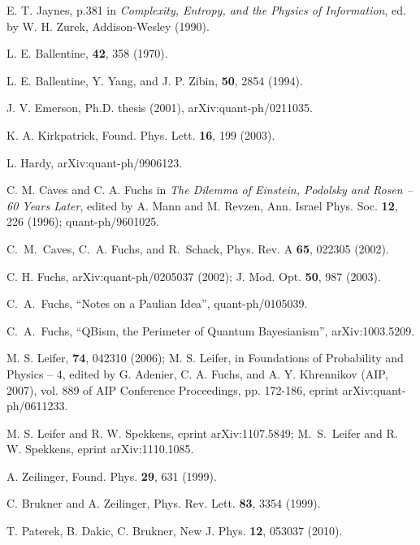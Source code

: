 \documentclass[pra,superscriptaddress,nofootinbib,12pt]{revtex4-2}
\begin{document}
\begin{thebibliography}{9}
 E. T. Jaynes, p.381 in \emph{Complexity, Entropy, and the Physics of Information}, ed. by W. H. Zurek, Addison-Wesley (1990).


 L. E. Ballentine, \rmp \textbf{42}, 358 (1970).

 L. E. Ballentine, Y. Yang, and J. P. Zibin, \pra \textbf{50}, 2854 (1994).

 J. V. Emerson, Ph.D. thesis (2001), arXiv:quant-ph/0211035.

 K. A. Kirkpatrick, Found. Phys. Lett. \textbf{16}, 199 (2003).

 L. Hardy, arXiv:quant-ph/9906123.


 C. M. Caves and C. A. Fuchs in \textit{The Dilemma of Einstein, Podolsky and Rosen -- 60 Years
Later}, edited by A. Mann and M. Revzen, Ann. Israel Phys. Soc. \textbf{12}, 226 (1996); quant-ph/9601025.

 C.~M.~Caves, C.~A. Fuchs, and R.~Schack, Phys. Rev. A \textbf{65}, 022305
(2002).

 C. H. Fuchs, arXiv:quant-ph/0205037 (2002); J. Mod. Opt.
\textbf{50}, 987 (2003).

 C.~A.~Fuchs, ``Notes on a Paulian Idea'',
quant-ph/0105039.

  C.~A.~Fuchs, ``QBism, the Perimeter of Quantum Bayesianism'',
arXiv:1003.5209.


 M. S. Leifer, \pra \textbf{74}, 042310 (2006); M. S. Leifer, in Foundations of Probability and Physics -- 4, edited by G. Adenier, C. A. Fuchs, and A. Y. Khrennikov (AIP, 2007), vol. 889 of AIP Conference Proceedings, pp. 172-186, eprint arXiv:quant-ph/0611233.

 M. S. Leifer and R. W. Spekkens, eprint arXiv:1107.5849; M.~S.~Leifer and R. W. Spekkens, eprint arXiv:1110.1085.

 A. Zeilinger, Found. Phys. \textbf{29}, 631 (1999).

 C. Brukner and A. Zeilinger, Phys. Rev. Lett. \textbf{83}, 3354 (1999).

 T. Paterek, B. Dakic, C. Brukner, New J. Phys. \textbf{12}, 053037 (2010).


\end{thebibliography}
\end{document}
